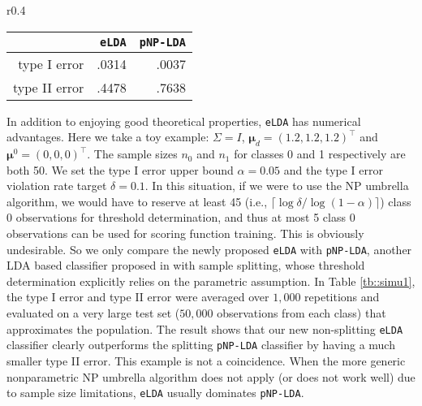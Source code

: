 \documentclass[12pt]{article}
\numberwithin{equation}{section}
\theoremstyle{remark}
\newcommand{\1}{{\rm 1}\kern-0.24em{\rm I}}
\begin{document}


\begin{wraptable}{r}{0.4\linewidth}
\vspace{-50pt}
\caption{\small \texttt{eLDA} vs. \texttt{pNP-LDA}.\label{tb::simu1}}
\hspace{+5pt}
\begin{tabular}{r|rr}
\hline
&\texttt{eLDA}&\texttt{pNP-LDA}\\
\hline
type I error &.0314&.0037\\
type II error &.4478&.7638\\\hline
\end{tabular}
\end{wraptable}

In addition to enjoying good theoretical properties, \verb+eLDA+ has numerical advantages.  Here we take a toy example:  $\Sigma = I$, $\bm{\mu}_d = (1.2, 1.2, 1.2)^{\top}$ and $\bm{\mu}^0 = (0,0,0)^{\top}$.  The sample sizes $n_0$ and $n_1$ for classes 0 and 1 respectively are both 50. We set the type I error upper bound $\alpha = 0.05$ and the type I error violation rate target $\delta = 0.1$.  In this situation, if we were to use the NP umbrella algorithm, we would have to reserve at least 45 (i.e., $\lceil \log \delta / \log(1-\alpha)\rceil$) class 0 observations for threshold determination, and thus at most 5 class 0 observations can be used for scoring function training. This is obviously undesirable. So we only compare the newly proposed \verb+eLDA+ with \verb+pNP-LDA+, another LDA based classifier proposed in \cite{Tong.Xia.Wang.Feng.2020} with sample splitting, whose threshold determination explicitly relies on the parametric assumption. In Table \ref{tb::simu1}, the type I error  and type II error were averaged over $1{,}000$ repetitions and evaluated on a very large test set ($50{,}000$ observations from each class) that approximates the population. The result shows that our new non-splitting \verb+eLDA+ classifier clearly outperforms the splitting \verb+pNP-LDA+ classifier by having a much smaller type II error. This example is not a coincidence. When the more generic nonparametric NP umbrella algorithm does not apply (or does not work well) due to sample size limitations, \verb+eLDA+ usually dominates \verb+pNP-LDA+.%
\end{document}
